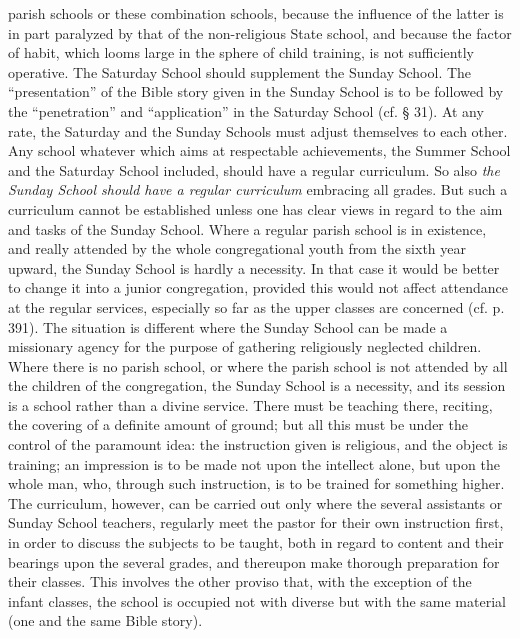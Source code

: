 parish schools or these combination schools, because the influence of the latter is in part paralyzed by that of the non-religious State school, and because the factor of habit, which looms large in the sphere of child training, is not sufficiently operative. The Saturday School should supplement the Sunday School. The “presentation” of the Bible story given in the Sunday School is to be followed by the “penetration” and “application” in the Saturday School (cf. § 31). At any rate, the Saturday and the Sunday Schools must adjust themselves to each other. Any school whatever which aims at respectable achievements, the Summer School and the Saturday School included, should have a regular curriculum. So also \emph{the Sunday School should have a regular curriculum} embracing all grades. But such a curriculum cannot be established unless one has clear views in regard to the aim and tasks of the Sunday School. Where a regular parish school is in existence, and really attended by the whole congregational youth from the sixth year upward, the Sunday School is hardly a necessity. In that case it would be better to change it into a junior congregation, provided this would not affect attendance at the regular services, especially so far as the upper classes are concerned (cf. p. 391). The situation is different where the Sunday School can be made a missionary agency for the purpose of gathering religiously neglected children. Where there is no parish school, or where the parish school is not attended by all the children of the congregation, the Sunday School is a necessity, and its session is a school rather than a divine service. There must be teaching there, reciting, the covering of a definite amount of ground; but all this must be under the control of the paramount idea: the instruction given is religious, and the object is training; an impression is to be made not upon the intellect alone, but upon the whole man, who, through such instruction, is to be trained for something higher. The curriculum, however,
can be carried out only where the several assistants or Sunday School teachers, regularly meet the pastor for their own instruction first, in order to discuss the subjects to be taught, both in regard to content and their bearings upon the several grades, and thereupon make thorough preparation for their classes. This involves the other proviso that, with the exception of the infant classes, the school is occupied not with diverse but with the same material (one and the same Bible story).

